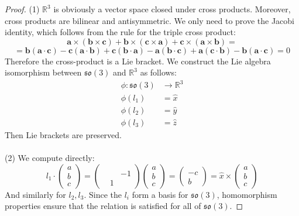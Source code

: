 \documentclass[12 pt]{article}
\newcommand{\R}{\mathbb{R}}
\newcommand{\fr}{\mathfrak}
\begin{document}
\begin{proof}
(1) $\R^3$ is obviously a vector space closed under cross products. Moreover, cross products are bilinear and antisymmetric. We only need to prove the Jacobi identity, which follows from the rule for the triple cross product:
\[    \mathbf{a} \times (\mathbf{b} \times \mathbf{c}) +   \mathbf{b} \times (\mathbf{c} \times \mathbf{a}) +  \mathbf{c} \times (\mathbf{a} \times \mathbf{b}) =      \]
\[  = \mathbf{b} (\mathbf{a} \cdot \mathbf{c})  - \mathbf{c} (\mathbf{a} \cdot \mathbf{b}) + \mathbf{c} (\mathbf{b} \cdot \mathbf{a}) - \mathbf{a} (\mathbf{b} \cdot \mathbf{c}) + \mathbf{a} (\mathbf{c} \cdot \mathbf{b}) - \mathbf{b} (\mathbf{a} \cdot \mathbf{c}) =0  \]
Therefore the cross-product is a Lie bracket. We construct the Lie algebra isomorphism between $\fr{so}(3)$ and $\R^3$ as follows:
\begin{align*}    \phi : \fr{so}(3) &\to \R^3   \\
\phi(l_1) &= \hat x  \\
\phi(l_2) &= \hat y  \\
\phi(l_3) &= \hat z  
  \end{align*}
Then Lie brackets are preserved.
\\
\\
(2) We compute directly:
\[      l_1 \cdot \left(   \begin{array} {c} a \\ b \\ c \end{array} \right)   = \left( \begin{array} {ccc} & & \\ & & -1 \\ & 1 & \end{array} \right) \left( \begin{array} {c} a \\ b \\ c \end{array} \right)  = \left( \begin{array} {c}  \\ -c \\ b \end{array} \right) = \hat x \times \left(   \begin{array} {c} a \\ b \\ c \end{array} \right)  \]
And similarly for $l_2, l_3$. Since the $l_i$ form a basis for $\fr{so}(3)$, homomorphism properties ensure that the relation is satisfied for all of $\fr{so}(3)$.
\end{proof}
\end{document}
